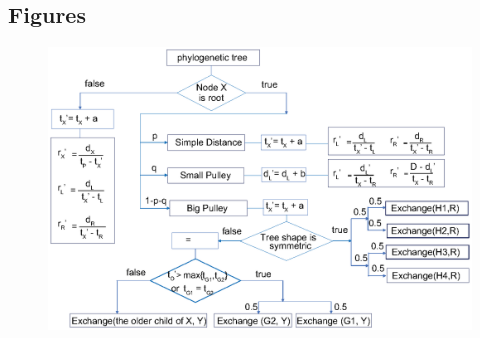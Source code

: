 \documentclass{bmcart}
\begin{document}
\begin{backmatter}



\section*{Figures}
\begin{figure}[h!]
\includegraphics[width=12cm]{Fig01-flowchart.eps}\\
\caption{}
\label{flowchart}
\end{figure}



\end{backmatter}
\end{document}
